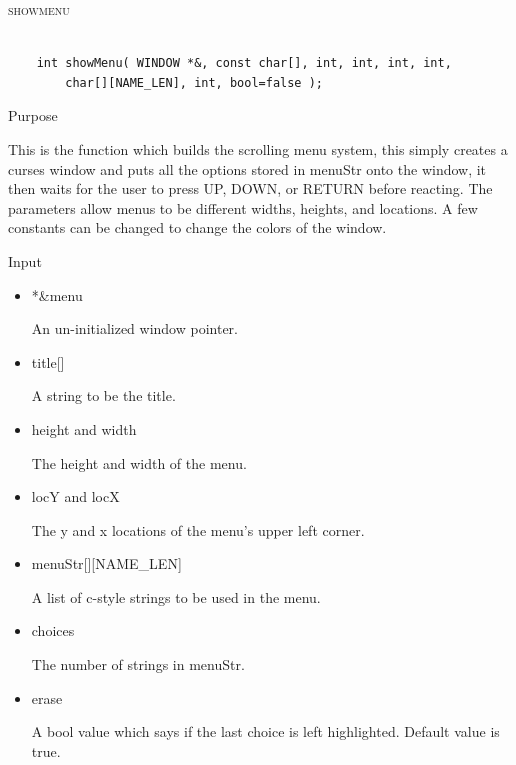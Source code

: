 \documentclass[pdftex, 11pt]{article}
\begin{document}
\begin{description}

	\item{\textsc{showmenu}}

		\begin{lstlisting}

	int showMenu( WINDOW *&, const char[], int, int, int, int, 
	    char[][NAME_LEN], int, bool=false );
		\end{lstlisting}

		\begin{description}
			\item{Purpose}
				
 				This is the function which builds the scrolling menu system, this simply
				creates a curses window and puts all the options stored in menuStr onto the
				window, it then waits for the user to press UP, DOWN, or RETURN before
				reacting.  The parameters allow menus to be different widths, heights, and
				locations.  A few constants can be changed to change the colors of the window.

			\item{Input}
				
				\begin{itemize}

					\item{*\&menu}

						An un-initialized window pointer.

					\item{title[]}

						A string to be the title.

					\item{height and width}

						The height and width of the menu.

					\item{locY and locX}
						
						The y and x locations of the menu's upper left corner.

					\item{menuStr[][NAME\_LEN] }

						A list of c-style strings to be used in the menu.
						
					\item{choices}
					
						The number of strings in menuStr.

					\item{erase}
						
						A bool value which says if the last choice is left highlighted.
						Default value is true.


\end{itemize}
\end{description}
\end{description}
\end{document}
